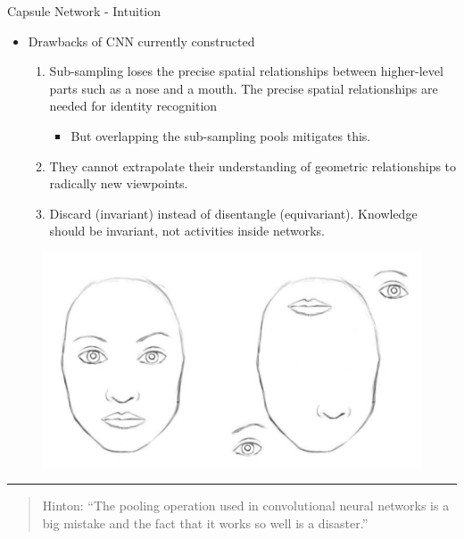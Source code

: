\documentclass{beamer}
\begin{document}
\begin{frame}{Capsule Network - Intuition}
  \begin{itemize}
  \item {
    Drawbacks of CNN currently constructed
  }
      \begin{enumerate}
        \item
          Sub-sampling loses the precise spatial relationships between higher-level parts such as a nose and a mouth. The precise spatial relationships are needed for identity recognition 
            \begin{itemize}
                \item
                But overlapping the sub-sampling pools mitigates this. 
            \end{itemize}
        \item{
        They cannot extrapolate their understanding of
geometric relationships to radically new viewpoints.}
        \item Discard (invariant) instead of disentangle (equivariant). Knowledge should be invariant, not activities inside networks.
        \end{enumerate}

  \end{itemize}
  
  \begin{figure}
      \centering
      \includegraphics[scale = 0.15]{faces.JPG}
  \end{figure}
  
  \pause %
  \noindent\rule{\textwidth}{1pt}
    \begin{quote}
      Hinton: “The pooling operation used in convolutional neural networks is a big mistake and the fact that it works so well is a disaster.”
  \end{quote}
\end{frame}
\end{document}
